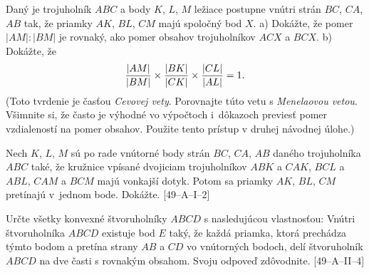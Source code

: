 {Daný je trojuholník $ABC$ a body $K$, $L$, $M$ ležiace postupne vnútri strán $BC$, $CA$, $AB$ tak, že priamky $AK$, $BL$, $CM$ majú spoločný bod $X$.\hfil\break
a) Dokážte, že pomer $|AM|\colon |BM|$ je rovnaký, ako pomer obsahov trojuholníkov $ACX$ a $BCX$.\hfil\break
b) Dokážte, že
$$
{|AM|\over |BM|}\cdot {|BK|\over |CK|}\cdot {|CL| \over |AL|}=1.
$$
(Toto tvrdenie je časťou {\it Cevovej vety}. Porovnajte túto vetu s {\it Menelaovou vetou}. Všimnite si, že často je výhodné vo výpočtoch i~dôkazoch previesť pomer vzdialeností na pomer obsahov. Použite tento prístup v druhej návodnej úlohe.)

Nech $K$, $L$, $M$ sú po rade vnútorné body strán $BC$, $CA$, $AB$ daného trojuholníka
$ABC$ také, že kružnice vpísané dvojiciam trojuholníkov $ABK$ a $CAK$, $BCL$ a $ABL$,
$CAM$ a $BCM$ majú vonkajší dotyk. Potom sa priamky $AK$, $BL$, $CM$ pretínajú v~jednom bode. Dokážte.
[49--A--I--2]

Určte všetky konvexné štvoruholníky $ABCD$ s nasledujúcou vlastnosťou: Vnútri štvoruholníka $ABCD$ existuje bod $E$ taký, že každá priamka, ktorá prechádza týmto bodom a pretína strany $AB$ a $CD$ vo vnútorných bodoch, delí štvoruholník $ABCD$ na dve časti s rovnakým obsahom. Svoju odpoveď zdôvodnite.
[49--A--II--4]
}

